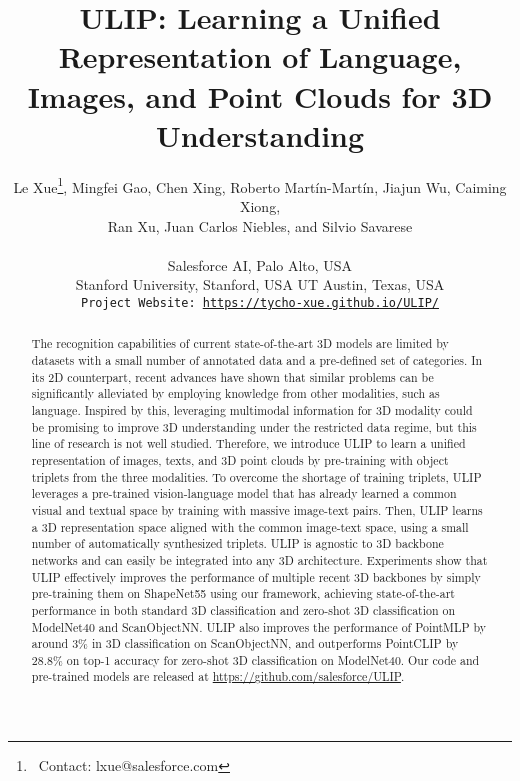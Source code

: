 \documentclass[10pt,twocolumn,letterpaper]{article}
\begin{document}
\title{ULIP: Learning a Unified Representation of Language, Images, and Point Clouds for 3D Understanding}
\author{Le Xue\thanks{\ Contact: lxue@salesforce.com},
Mingfei Gao,
Chen Xing,
Roberto Martín-Martín,
Jiajun Wu,
Caiming Xiong,
\\
Ran Xu,
Juan Carlos Niebles, and
Silvio Savarese
\\
\\
 Salesforce AI, Palo Alto, USA \\
 Stanford University, Stanford, USA \quad  UT Austin, Texas, USA \\
{\tt\small Project Website: \href{https://tycho-xue.github.io/ULIP/}{https://tycho-xue.github.io/ULIP/}}}

\maketitle

\begin{abstract}
The recognition capabilities of current state-of-the-art 3D models are limited by datasets with a small number of annotated data and a pre-defined set of categories.
In its 2D counterpart, recent advances have shown that similar problems can be significantly alleviated by employing knowledge from other modalities, such as language.
Inspired by this, leveraging multimodal information for 3D modality could be promising to improve 3D understanding under the restricted data regime, but this line of research is not well studied.
Therefore, we introduce ULIP to learn a unified representation of images, texts, and 3D point clouds by pre-training with object triplets from the three modalities.
To overcome the shortage of training triplets, ULIP leverages a pre-trained vision-language model that has already learned a common visual and textual space by training with massive image-text pairs. Then, ULIP learns a 3D representation space aligned with the common image-text space, using a small number of automatically synthesized triplets.
ULIP is agnostic to 3D backbone networks and can easily be integrated into any 3D architecture.
Experiments show that ULIP effectively improves the performance of multiple recent 3D backbones by simply pre-training them on ShapeNet55 using our framework, achieving state-of-the-art performance in both standard 3D classification and zero-shot 3D classification on ModelNet40 and ScanObjectNN. ULIP also improves the performance of PointMLP by around 3\% in 3D classification on ScanObjectNN, and outperforms PointCLIP by 28.8\% on top-1 accuracy for zero-shot 3D classification on ModelNet40. Our code and pre-trained models are released at \href{https://github.com/salesforce/ULIP}{https://github.com/salesforce/ULIP}.
\end{abstract}
\end{document}
